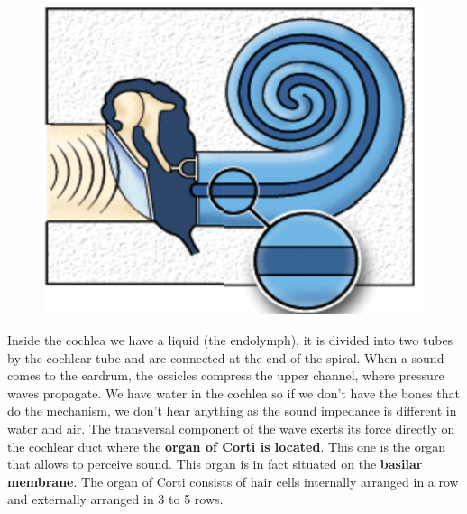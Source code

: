 	\begin{figure}
	\vspace{-5mm}
	\includegraphics[scale=0.15]{acoustics/ch2/2}
	\label{fig:2.2}
	\end{figure}
	Inside the cochlea we have a liquid (the endolymph), it is divided into two tubes by the cochlear tube and are connected at the end of the spiral. When a sound comes to the eardrum, the ossicles compress the upper channel, where pressure waves propagate. We have water in the cochlea so if we don't have the bones that do the mechanism, we don't hear anything as the sound impedance is different in water and air. The transversal component of the wave exerts its force directly on the cochlear duct where the \textbf{organ of Corti is located}. This one is the organ that allows to perceive sound. This organ is in fact situated on the \textbf{basilar membrane}. The organ of Corti consists of hair cells internally arranged in a row and externally arranged in 3 to 5 rows.
	
